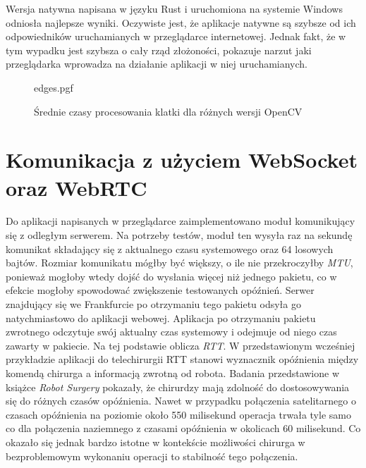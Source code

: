 \documentclass[language=polish,type=master]{aghmodern}
\begin{document}
Wersja natywna napisana w języku Rust i uruchomiona na systemie Windows odniosła najlepsze wyniki.
Oczywiste jest, że aplikacje natywne są szybsze od ich odpowiedników uruchamianych w przeglądarce internetowej.
Jednak fakt, że w tym wypadku jest szybsza o cały rząd złożoności, pokazuje narzut jaki przeglądarka wprowadza na działanie aplikacji w niej uruchamianych.

\begin{figure}[H]
    \centering
    {edges.pgf}
    \caption{Średnie czasy procesowania klatki dla różnych wersji OpenCV}
    \label{fig:edges}
\end{figure}

\section{Komunikacja z użyciem WebSocket oraz WebRTC}
Do aplikacji napisanych w przeglądarce zaimplementowano moduł komunikujący się z odległym serwerem.
Na potrzeby testów, moduł ten wysyła raz na sekundę komunikat składający się z aktualnego czasu systemowego oraz 64 losowych bajtów.
Rozmiar komunikatu mógłby być większy, o ile nie przekroczyłby \emph{MTU}\footnotemark{}, ponieważ mogłoby wtedy dojść do wysłania więcej niż jednego pakietu, co w efekcie mogłoby spowodować zwiększenie testowanych opóźnień.
Serwer znajdujący się we Frankfurcie po otrzymaniu tego pakietu odsyła go natychmiastowo do aplikacji webowej.
Aplikacja po otrzymaniu pakietu zwrotnego odczytuje swój aktualny czas systemowy i odejmuje od niego czas zawarty w pakiecie.
Na tej podstawie oblicza \emph{RTT}\footnotemark{}.
W przedstawionym wcześniej przykładzie aplikacji do telechirurgii RTT stanowi wyznacznik opóźnienia między komendą chirurga a informacją zwrotną od robota.
Badania przedstawione w książce \emph{Robot Surgery} \cite{telesurgery} pokazały, że chirurdzy mają zdolność do dostosowywania się do różnych czasów opóźnienia.
Nawet w przypadku połączenia satelitarnego o czasach opóźnienia na poziomie około 550 milisekund operacja trwała tyle samo co dla połączenia naziemnego z czasami opóźnienia w okolicach 60 milisekund.
Co okazało się jednak bardzo istotne w kontekście możliwości chirurga w bezproblemowym wykonaniu operacji to stabilność tego połączenia.
\end{document}
